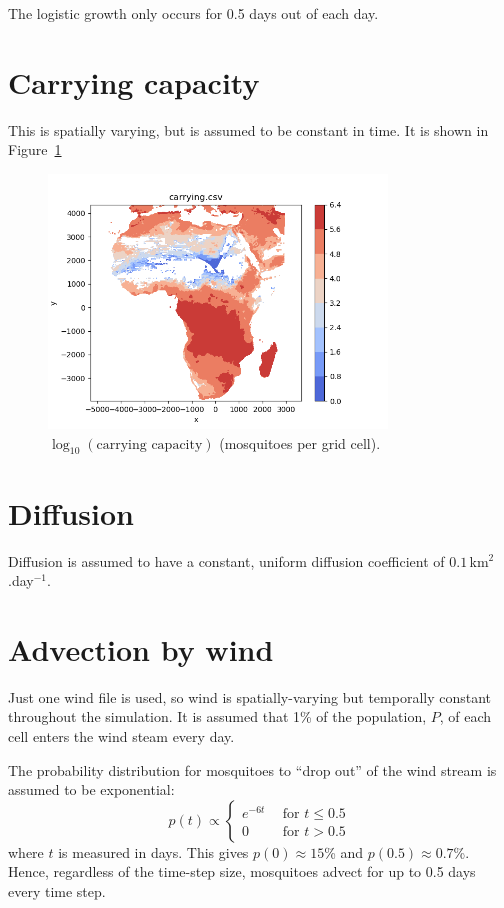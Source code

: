 \documentclass{article}
\begin{document}
The logistic growth only occurs for 0.5 days out of each day.

\section{Carrying capacity}

This is spatially varying, but is assumed to be constant in time.  It is shown in Figure~\ref{carrying.fig}

\begin{figure}[htb]
  \centering
  \includegraphics[width=9cm]{carrying.png}
  \caption{\label{carrying.fig}$\log_{10}(\mbox{carrying capacity})$ (mosquitoes per grid cell).}
\end{figure}

\section{Diffusion}

Diffusion is assumed to have a constant, uniform diffusion coefficient of $0.1$\,km$^{2}$.day$^{-1}$.

\section{Advection by wind}

Just one wind file is used, so wind is spatially-varying but temporally constant throughout the simulation.  It is assumed that 1\% of the population, $P$, of each cell enters the wind steam every day.

The probability distribution for mosquitoes to ``drop out'' of the wind stream is assumed to be exponential:
\begin{equation}
  p(t) \propto \left\{
  \begin{array}{ll}
    e^{-6t} & \ \ \mbox{for } t \leq 0.5 \\
    0 & \ \ \mbox{for } t > 0.5
  \end{array}
  \right.
\end{equation}
where $t$ is measured in days.  This gives $p(0)\approx 15$\% and $p(0.5) \approx 0.7$\%.  Hence, regardless of the time-step size, mosquitoes advect for up to 0.5 days every time step.
\end{document}
